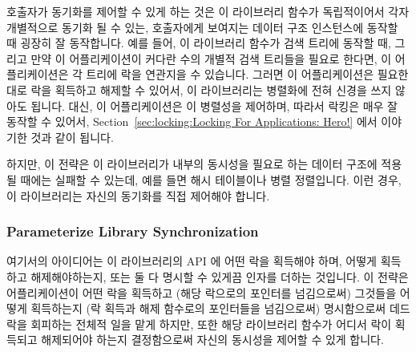 호출자가 동기화를 제어할 수 있게 하는 것은 이 라이브러리 함수가 독립적이어서
각자 개별적으로 동기화 될 수 있는, 호출자에게 보여지는 데이터 구조 인스턴스에
동작할 때 굉장히 잘 동작합니다.
예를 들어, 이 라이브러리 함수가 검색 트리에 동작할 때, 그리고 만약 이
어플리케이션이 커다란 수의 개별적 검색 트리들을 필요로 한다면, 이
어플리케이션은 각 트리에 락을 연관지을 수 있습니다.
그러면 이 어플리케이션은 필요한 대로 락을 획득하고 해제할 수 있어서, 이
라이브러리는 병렬화에 전혀 신경을 쓰지 않아도 됩니다.
대신, 이 어플리케이션은 이 병렬성을 제어하며, 따라서 락킹은 매우 잘 동작할 수
있어서,
Section~\ref{sec:locking:Locking For Applications: Hero!} 에서 이야기한 것과
같이 됩니다.

하지만, 이 전략은 이 라이브러리가 내부의 동시성을 필요로 하는 데이터 구조에
적용될 때에는 실패할 수 있는데, 예를 들면 해시 테이블이나 병렬 정렬입니다.
이런 경우, 이 라이브러리는 자신의 동기화를 직접 제어해야 합니다.

\subsubsection{Parameterize Library Synchronization}
\label{sec:locking:Parameterize Library Synchronization}

여기서의 아이디어는 이 라이브러리의 API 에 어떤 락을 획득해야 하며, 어떻게
획득하고 해제해야하는지, 또는 둘 다 명시할 수 있게끔 인자를 더하는 것입니다.
이 전략은 어플리케이션이 어떤 락을 획득하고 (해당 락으로의 포인터를 넘김으로써)
그것들을 어떻게 획득하는지 (락 획득과 해제 함수로의 포인터들을 넘김으로써)
명시함으로써 데드락을 회피하는 전체적 일을 맡게 하지만, 또한 해당 라이브러리
함수가 어디서 락이 획득되고 해제되어야 하는지 결정함으로써 자신의 동시성을
제어할 수 있게 합니다.

